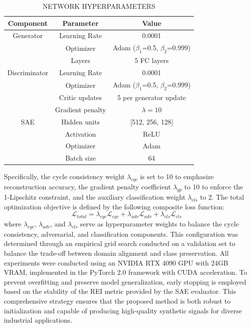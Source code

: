\documentclass[twocolumn]{IEEEtran}
\begin{document}
\begin{table}[htbp]
\centering
\caption{NETWORK HYPERPARAMETERS}
\label{tab:hyperparams}
\begin{tabular}{ccc}
\hline
Component & Parameter & Value \\
\hline
Generator & Learning Rate & 0.0001 \\
 & Optimizer & Adam ($\beta_1$=0.5, $\beta_2$=0.999) \\
 & Layers & 5 FC layers \\
Discriminator & Learning Rate & 0.0001 \\
 & Optimizer & Adam ($\beta_1$=0.5, $\beta_2$=0.999) \\
 & Critic updates & 5 per generator update \\
 & Gradient penalty & $\lambda=10$ \\
SAE & Hidden units & [512, 256, 128] \\
 & Activation & ReLU \\
 & Optimizer & Adam \\
 & Batch size & 64 \\
\hline
\end{tabular}
\end{table}
Specifically, the cycle consistency weight $\lambda_{cyc}$ is set to 10 to emphasize reconstruction accuracy, the gradient penalty coefficient $\lambda_{gp}$ to 10 to enforce the 1-Lipschitz constraint, and the auxiliary classification weight $\lambda_{cls}$ to 2. The total optimization objective is defined by the following composite loss function:
\begin{equation}
\mathcal{L}_{total} = \lambda_{cyc}\mathcal{L}_{cyc} + \lambda_{adv}\mathcal{L}_{adv} + \lambda_{cls}\mathcal{L}_{cls}
\label{eq:total_loss}
\end{equation}
where $\lambda_{cyc}$, $\lambda_{adv}$, and $\lambda_{cls}$ serve as hyperparameter weights to balance the cycle consistency, adversarial, and classification components. This configuration was determined through an empirical grid search conducted on a validation set to balance the trade-off between domain alignment and class preservation. All experiments were conducted using an NVIDIA RTX 4090 GPU with 24GB VRAM, implemented in the PyTorch 2.0 framework with CUDA acceleration. To prevent overfitting and preserve model generalization, early stopping is employed based on the stability of the REI metric provided by the SAE evaluator. This comprehensive strategy ensures that the proposed method is both robust to initialization and capable of producing high-quality synthetic signals for diverse industrial applications.
\end{document}
